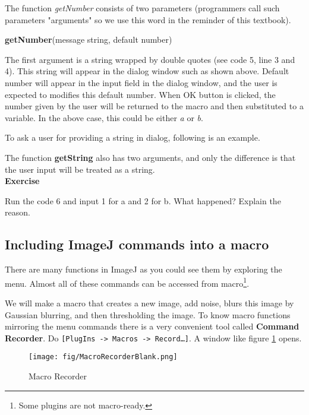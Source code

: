 \documentclass[11pt,a4paper,oneside]{report}
\newenvironment{indentexercise}[1]%
{{\setlength{\leftmargin}{2em}}%
\textbf{Exercise \thesubsection-#1}%
\begin{list}{}%
	\item%
}
{\end{list}}
\newenvironment{indentCom}%
{\begin{list}{}%
         {\setlength{\leftmargin}{1em}}%
         \item[]%
}
{\end{list}}
\newcommand{\ijmenu}[1]{\texttt{\small#1}}
\begin{document}
The function \textit{getNumber} consists of two parameters (programmers call such parameters "arguments" so we use this word in the reminder of this textbook).
\begin{indentCom}
\textbf{getNumber}(message string, default number)
\end{indentCom}
The first argument is a string wrapped by double quotes (see code 5, line 3
and 4). This string will appear in the dialog window such as shown above. 
Default number will appear in the input field in the dialog window, 
and the user is expected to modifies this default number. 
When OK button is clicked, the number given by the user will be returned to
the macro and then substituted to a variable. In the above case, this could be
either \textit{a} or \textit{b}.
 
To ask a user for providing a string in dialog, following is an example. 


The function \textbf{getString} also has two arguments, 
and only the difference is that the user input will be treated as a string. \\

\begin{indentexercise}{1}
Run the code 6 and input 1 for a and 2 for b. What happened? Explain the reason. 
\end{indentexercise}

\subsection{Including ImageJ commands into a macro}
There are many functions in ImageJ as you could see them by exploring the menu.
Almost all of these commands can be accessed from macro\footnote{Some plugins
are not macro-ready.}.

We will make a macro that creates a new image, add noise, blurs this image by
Gaussian blurring, and then thresholding the image. To know macro functions mirroring the menu commands 
there is a very convenient tool called \textbf{Command Recorder}. 
Do \ijmenu{[PlugIns -> Macros -> Record\ldots]}. A window like figure
\ref{fig_macroRecorderBlank} opens.

\begin{figure}[htbp]
\begin{center}
\texttt{[image: fig/MacroRecorderBlank.png]}
\caption{Macro Recorder} \label{fig_macroRecorderBlank}
\end{center}
\end{figure}
\end{document}
